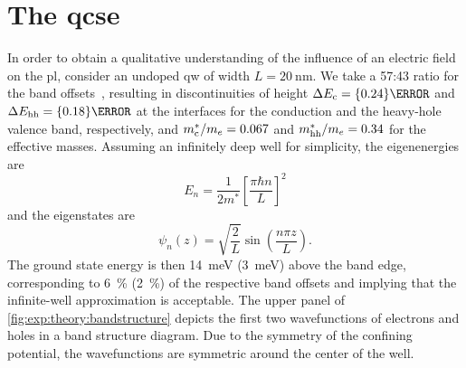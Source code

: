 \clearpage

\section{The \acrlong{qcse}}\label{sec:exp:theory:qcse}
In order to obtain a qualitative understanding of the influence of an electric field on the \gls{pl}, consider an undoped  \gls{qw} of width $L = \qty{20}{\nano\meter}$.
We take a 57:43 ratio for the band offsets~\cite{Miller1984a}, resulting in discontinuities of height $\Delta E_{\mr{c}} = \qty{0.24}{\electronvolt}$ and $\Delta E_{\mr{hh}} = \qty{0.18}{\electronvolt}$ at the interfaces for the conduction and the heavy-hole valence band, respectively, and $m^\ast_{\mathrm{c}}/m_e = \num{0.067}$ and $m^\ast_{\mathrm{hh}}/m_e = \num{0.34}$ for the effective masses.
Assuming an infinitely deep well for simplicity, the eigenenergies are
\begin{equation}\label{eq:exp:theory:square_well:eps}
    E_n = \frac{1}{2 m^\ast}\left[\frac{\pi\hbar n}{L}\right]^2
\end{equation}
and the eigenstates are
\begin{equation}\label{eq:exp:theory:square_well:psi}
    \psi_n(z) = \sqrt{\frac{2}{L}}\sin(\frac{n\pi z}{L}).
\end{equation}
The ground state energy is then \qty{14}{\milli\electronvolt} (\qty{3}{\milli\electronvolt}) above the band edge, corresponding to \qty{6}{\percent} (\qty{2}{\percent}) of the respective band offsets and implying that the infinite-well approximation is acceptable.
The upper panel of \cref{fig:exp:theory:bandstructure} depicts the first two wavefunctions of electrons and holes in a band structure diagram.
Due to the symmetry of the confining potential, the wavefunctions are symmetric around the center of the well.

